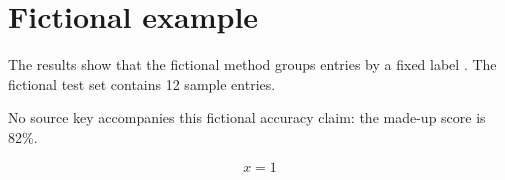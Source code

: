 \section{Fictional example}
The results show that the fictional method groups entries by a fixed label \cite{synthetic-grouping-2026}. The fictional test set contains 12 sample entries.

No source key accompanies this fictional accuracy claim: the made-up score is 82\%.

\begin{equation}
  x = 1
\end{equation}
